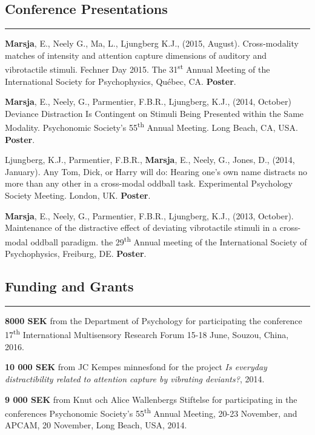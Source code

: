 \documentclass[]{article}
\begin{document}
\subsection{Conference Presentations}\label{conference-presentations}

\hrule

\textbf{Marsja}, E., Neely G., Ma, L., Ljungberg K.J., (2015, August).
Cross-modality matches of intensity and attention capture dimensions of
auditory and vibrotactile stimuli. Fechner Day 2015. The
31\textsuperscript{st} Annual Meeting of the International Society for
Psychophysics, Québec, CA. \textbf{Poster}.

\textbf{Marsja}, E., Neely, G., Parmentier, F.B.R., Ljungberg, K.J.,
(2014, October) Deviance Distraction Is Contingent on Stimuli Being
Presented within the Same Modality. Psychonomic Society's
55\textsuperscript{th} Annual Meeting. Long Beach, CA, USA.
\textbf{Poster}.

Ljungberg, K.J., Parmentier, F.B.R., \textbf{Marsja}, E., Neely, G.,
Jones, D., (2014, January). Any Tom, Dick, or Harry will do: Hearing
one's own name distracts no more than any other in a cross-modal oddball
task. Experimental Psychology Society Meeting. London, UK.
\textbf{Poster}.

\textbf{Marsja}, E., Neely, G., Parmentier, F.B.R., Ljungberg, K.J.,
(2013, October). Maintenance of the distractive effect of deviating
vibrotactile stimuli in a cross-modal oddball paradigm. the
29\textsuperscript{th} Annual meeting of the International Society of
Psychophysics, Freiburg, DE. \textbf{Poster}.

\subsection{Funding and Grants}\label{funding-and-grants}

\hrule

\textbf{8000 SEK} from the Department of Psychology for participating
the conference 17\textsuperscript{th} International Multisensory
Research Forum 15-18 June, Souzou, China, 2016.

\textbf{10 000 SEK} from JC Kempes minnesfond for the project \emph{Is
everyday distractibility related to attention capture by vibrating
deviants?}, 2014.

\textbf{9 000 SEK} from Knut och Alice Wallenbergs Stiftelse for
participating in the conferences Psychonomic Society's
55\textsuperscript{th} Annual Meeting, 20-23 November, and APCAM, 20
November, Long Beach, USA, 2014.
\end{document}
